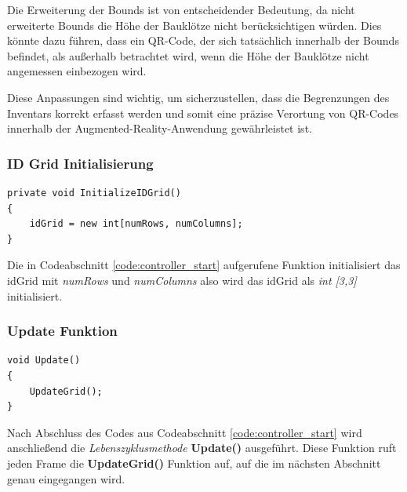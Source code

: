 Die Erweiterung der Bounds ist von entscheidender Bedeutung, da nicht erweiterte Bounds die Höhe der Bauklötze nicht
berücksichtigen würden. Dies könnte dazu führen, dass ein QR-Code, der sich tatsächlich innerhalb der Bounds befindet,
als außerhalb betrachtet wird, wenn die Höhe der Bauklötze nicht angemessen einbezogen wird.

Diese Anpassungen sind wichtig, um sicherzustellen, dass die Begrenzungen des Inventars korrekt erfasst werden und somit
eine präzise Verortung von QR-Codes innerhalb der Augmented-Reality-Anwendung gewährleistet ist.\\

\subsubsection{ID Grid Initialisierung}
\begin{lstlisting}[style=csharp, caption={Initialisierung des idGrids}, label=code:controller_initialize]
private void InitializeIDGrid()
{
    idGrid = new int[numRows, numColumns];
}
\end{lstlisting}
Die in Codeabschnitt \ref{code:controller_start} aufgerufene Funktion initialisiert das idGrid mit \textit{numRows} und
\textit{numColumns} also wird das idGrid als \textit{int [3,3]} initialisiert.\\

\subsubsection{Update Funktion}
\begin{lstlisting}[style=csharp, caption={Initialisierung des idGrids}, label=code:controller_update]
void Update()
{
    UpdateGrid();
}
\end{lstlisting}
Nach Abschluss des Codes aus Codeabschnitt \ref{code:controller_start} wird anschließend die \textit{Lebenszyklusmethode}
\textbf{Update()} ausgeführt. Diese Funktion ruft jeden Frame die \textbf{UpdateGrid()} Funktion auf, auf die im nächsten
Abschnitt genau eingegangen wird.\\

